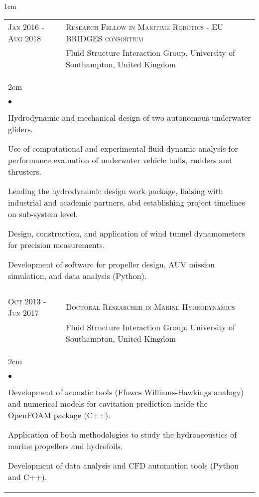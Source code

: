 \documentclass[a4paper,10pt]{article}
\newcommand{\squishlist}{
	\begin{list}{$\bullet$}
	{
		\setlength{\itemsep}{0pt}
		\setlength{\parsep}{0pt}
		\setlength{\topsep}{0pt}
		\setlength{\partopsep}{0pt}
		\setlength{\leftmargin}{2em}
		\setlength{\labelwidth}{1.5em}
		\setlength{\labelsep}{0.5em}
	}
}
\newcommand{\squishend}{\end{list}}
\begin{document}
\begin{minipage}{\textwidth}
\begin{adjustwidth}{}{1cm}
\begin{tabular}{p{3.5cm} p{12.9cm}}
\textsc{Jan 2016 - Aug 2018} & \textsc{Research Fellow in Maritime Robotics - EU BRIDGES consortium} \\
							& Fluid Structure Interaction Group, University of Southampton, United Kingdom \vspace{0.1cm} \\
%
\multicolumn{2}{l}{
\hspace{1cm}\begin{minipage}[t]{\textwidth}
\begin{adjustwidth}{}{2cm}
\squishlist
	\item Hydrodynamic and mechanical design of two autonomous underwater gliders.
	\item Use of computational and experimental fluid dynamic analysis for performance evaluation of underwater vehicle hulls, rudders and thrusters.
	\item Leading the hydrodynamic design work package, liaising with industrial and academic partners,  abd establishing project timelines on sub-system level.
	\item Design, construction, and application of wind tunnel dynamometers for precision measurements.
	\item Development of software for propeller design, AUV mission simulation, and data analysis (Python).
\squishend
\end{adjustwidth}
\end{minipage}
} \\
\\

\textsc{Oct 2013 - Jun 2017} & \textsc{Doctoral Researcher in Marine Hydrodynamics} \\%
							& Fluid Structure Interaction Group, University of Southampton, United Kingdom \vspace{0.1cm} \\
%
\multicolumn{2}{l}{
\hspace{1cm}\begin{minipage}[t]{\textwidth}
\begin{adjustwidth}{}{2cm}
\squishlist
	\item Development of acoustic tools (Ffowcs Williams-Hawkings analogy) and numerical models for cavitation prediction inside the OpenFOAM package (C++).
	\item Application of both methodologies to study the hydroacoustics of marine propellers and hydrofoils.
	\item Development of data analysis and CFD automation tools (Python and C++).
\squishend
\end{adjustwidth}
\end{minipage}
} \\


\end{tabular}
\end{adjustwidth}
\end{minipage}
\end{document}

